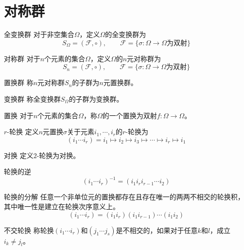 \documentclass[lang = cn, scheme = chinese, thmcnt = section]{elegantbook}
\begin{document}
\section{对称群}

\begin{definition}{全变换群}
	对于非空集合$\Omega$，定义$\Omega$​的全变换群为
	$$
	S_\Omega=(\mathscr{F},\circ),\qquad \mathscr{F}=\{ \sigma:\Omega\to\Omega\text{为双射} \}
	$$
\end{definition}

\begin{definition}{对称群}
	对于$n$个元素的集合$\Omega$，定义$\Omega$的$n$元对称群为
	$$
	S_n=(\mathscr{F},\circ),\qquad \mathscr{F}=\{ \sigma:\Omega\to\Omega\text{为双射} \}
	$$
\end{definition}

\begin{definition}{置换群}
	称$n$元对称群$S_n$的子群为$n$元置换群。
\end{definition}

\begin{definition}{变换群}
	称全变换群$S_\Omega$的子群为变换群。
\end{definition}

\begin{definition}{置换}
	对于$n$个元素的集合$\Omega$，称$\Omega$的一个置换为双射$f:\Omega\to\Omega$。
\end{definition}

\begin{definition}{$r$-轮换}
	定义$n$元置换$\sigma$关于元素$i_1,\cdots,i_r$的$r$-轮换为
	$$
	(i_1\cdots i_r)=i_1\mapsto i_2 \mapsto i_3\mapsto\cdots\mapsto i_r \mapsto i_1
	$$
\end{definition}

\begin{definition}{对换}
	定义$2$-轮换为对换。
\end{definition}

\begin{theorem}{轮换的逆}
	$$
	(i_1\cdots i_r)^{-1}=(i_1i_{r}i_{r-1}\cdots i_2)
	$$
\end{theorem}

\begin{theorem}{轮换的分解}
	任意一个非单位元的置换都存在且存在唯一的两两不相交的轮换积，其中唯一性是建立在轮换次序意义上。
	$$
	(i_1\cdots i_r)=(i_1i_{r})(i_1i_{r-1})\cdots (i_1i_2)
	$$
\end{theorem}

\begin{definition}{不交轮换}
	称轮换$(i_1\cdots i_r)$和$(j_1\cdots j_s)$是不相交的，如果对于任意$k$和$l$，成立$i_k\ne j_l$。
\end{definition}
\end{document}
